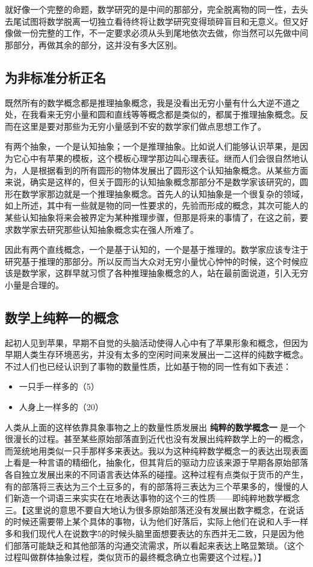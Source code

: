 \documentclass[12pt,oneside]{book}
\begin{document}
就好像一个完整的命题，数学研究的是中间的那部分，完全脱离物的同一性，去头去尾试图将数学脱离一切独立看待终将让数学研究变得琐碎盲目和无意义。但又好像做一份完整的工作，不一定要求必须从头到尾地依次去做，你当然可以先做中间那部分，再做其余的部分，这并没有多大区别。


\subsection{为非标准分析正名}
既然所有的数学概念都是推理抽象概念，我是没看出无穷小量有什么大逆不道之处，在我看来无穷小量和圆和直线等等概念都是类似的，都属于推理抽象概念。反而在这里是要对那些为无穷小量感到不安的数学家们做点思想工作了。

有两个抽象，一个是认知抽象；一个是推理抽象。比如说人们能够认识苹果，是因为它心中有苹果的模板，这个模板心理学那边叫心理表征。继而人们会很自然地认为，人是根据看到的所有圆形的物体发展出了圆形这个认知抽象概念。从某些方面来说，确实是这样的，但关于圆形的认知抽象概念那部分不是数学家该研究的，圆形在数学家那边就是一个推理抽象概念。首先人的认知抽象是一个很复杂的领域，如上所述，其中有一些就是物的同一性要求的，先验而形成的概念，其次可能人的某些认知抽象将来会被界定为某种推理步骤，但那是将来的事情了，在这之前，要求数学家去研究那些认知抽象概念实在强人所难了。

因此有两个直线概念，一个是基于认知的，一个是基于推理的。数学家应该专注于研究基于推理的那部分。所以反而当大众对无穷小量忧心忡忡的时候，这个时候应该是数学家，这群早就习惯了各种推理抽象概念的人，站在最前面说道，引入无穷小量是合理的。


\subsection{数学上纯粹一的概念}
起初人见到苹果，早期不自觉的头脑活动使得人心中有了苹果形象和概念，但因为早期人类生存环境恶劣，并没有太多的空闲时间来发展出一二这样的纯数字概念。不过人们也已经认识到了事物的数量性质，比如基于物的同一性有如下表述：

\begin{itemize}
\item 一只手一样多的（5）
\item 人身上一样多的（20）
\end{itemize}

人类从上面的这样依靠具象事物之上的数量性质发展出 \textbf{纯粹的数学概念一} 是一个很漫长的过程。甚至某些原始部落直到近代也没有发展出纯粹数学上的一的概念，而笼统地用类似一只手那样多来表达。我以为这种纯粹数学概念一的表达出现表面上看是一种言语的精细化，抽象化，但其背后的驱动力应该来源于早期各原始部落各自独立发展出来的不同语言表达体系的碰撞。这种过程有点类似于货币的产生，有的部落将三表达为三个土豆多的，有的部落将三表达为三个苹果多的，慢慢的人们新造一个词语三来实实在在地表达事物的这个三的性质——即纯粹地数学概念三。【这里说的意思不要自大地认为很多原始部落还没有发展出数字概念，在说话的时候还需要带上某个具体的事物，认为他们好落后，实际上他们在说和人手一样多和我们现代人在说数字5的时候头脑里面想要表达的东西并无二致，只是因为他们部落可能缺乏和其他部落的沟通交流需求，所以看起来表达上略显繁琐。（这个过程叫做群体抽象过程，类似货币的最终概念确立也需要这个过程。）】
\end{document}
